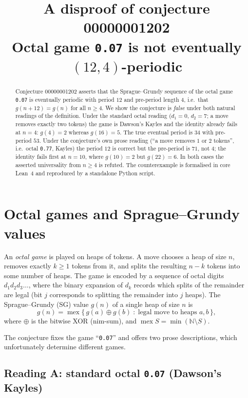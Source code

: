 \documentclass[11pt]{article}
\title{A disproof of conjecture 00000001202\\[2pt]
  \large Octal game \texttt{0.07} is not eventually $(12,4)$-periodic}
\author{}
\date{}
\newcommand{\mex}{\operatorname{mex}}
\newcommand{\Sg}{g}
\begin{document}
\maketitle

\begin{abstract}
Conjecture 00000001202 asserts that the Sprague--Grundy sequence of the
octal game \texttt{0.07} is eventually periodic with period $12$ and
pre-period length $4$, i.e.\ that $\Sg(n+12)=\Sg(n)$ for all
$n\ge 4$. We show the conjecture is \emph{false} under both natural
readings of the definition. Under the standard octal reading
($d_1=0$, $d_2=7$; a move removes exactly two tokens) the game is
Dawson's Kayles and the identity already fails at $n=4$:
$\Sg(4)=2$ whereas $\Sg(16)=5$. The true eventual period is $34$ with
pre-period $53$. Under the conjecture's own prose reading (``a move
removes $1$ or $2$ tokens'', i.e.\ octal \texttt{0.77}, Kayles) the
period $12$ is correct but the pre-period is $71$, not $4$; the identity
fails first at $n=10$, where $\Sg(10)=2$ but $\Sg(22)=6$. In both cases
the asserted universality from $n\ge 4$ is refuted. The counterexample
is formalised in core Lean~4 and reproduced by a standalone Python
script.
\end{abstract}

\section{Octal games and Sprague--Grundy values}

An \emph{octal game} is played on heaps of tokens. A move chooses a heap
of size $n$, removes exactly $k\ge 1$ tokens from it, and splits the
resulting $n-k$ tokens into some number of heaps. The game is encoded by
a sequence of octal digits $d_1d_2d_3\dots$, where the binary expansion
of $d_k$ records which splits of the remainder are legal (bit
$j$ corresponds to splitting the remainder into $j$ heaps). The
Sprague--Grundy (SG) value $\Sg(n)$ of a single heap of size $n$ is
\begin{equation}\label{eq:sg}
  \Sg(n)=\mex\bigl\{\,\Sg(a)\oplus\Sg(b)\;:\;\text{legal move to heaps }
  a,b\,\bigr\},
\end{equation}
where $\oplus$ is the bitwise XOR (nim-sum), and
$\mex S=\min(\mathbb{N}\setminus S)$.

The conjecture fixes the game ``\texttt{0.07}'' and offers two prose
descriptions, which unfortunately determine different games.

\subsection{Reading A: standard octal \texttt{0.07} (Dawson's Kayles)}
\end{document}
